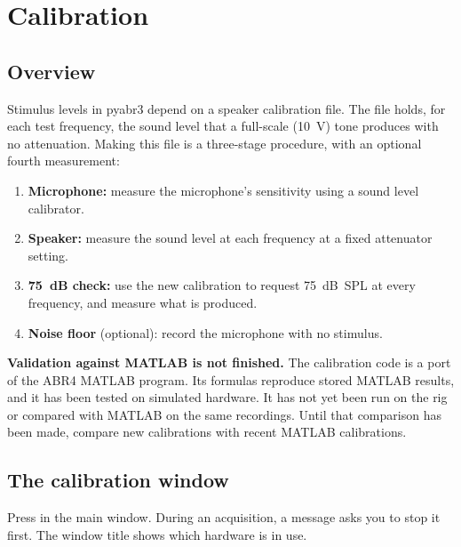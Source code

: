 \chapter{Calibration}
\label{ch:calibration}

\section{Overview}
\label{sec:cal-overview}

Stimulus levels in pyabr3 depend on a speaker calibration file. The file holds, for each
test frequency, the sound level that a full-scale (10~V) tone produces with no
attenuation. Making this file is a three-stage procedure, with an optional fourth
measurement:

\begin{enumerate}
  \item \textbf{Microphone:} measure the microphone's sensitivity using a sound level
        calibrator.
  \item \textbf{Speaker:} measure the sound level at each frequency at a fixed
        attenuator setting.
  \item \textbf{75~dB check:} use the new calibration to request 75~dB~SPL at every
        frequency, and measure what is produced.
  \item \textbf{Noise floor} (optional): record the microphone with no stimulus.
\end{enumerate}


\begin{caution}
\textbf{Validation against MATLAB is not finished.}
The calibration code is a port of the ABR4 MATLAB program. Its formulas reproduce
stored MATLAB results, and it has been tested on simulated hardware. It has not yet
been run on the rig or compared with MATLAB on the same recordings. Until that
comparison has been made, compare new calibrations with recent MATLAB calibrations.
\end{caution}

\section{The calibration window}

Press  in the main window. During an acquisition, a message asks you to
stop it first. The window title shows which hardware is in use.

